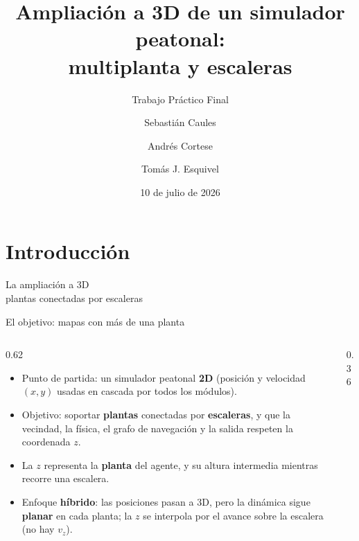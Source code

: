 \documentclass[10pt,aspectratio=169,t]{beamer}
\title[TP Final -- Simulador peatonal 3D]{Ampliación a 3D de un simulador peatonal:\\
  multiplanta y escaleras}
\subtitle{Trabajo Práctico Final}
\author[Caules, Cortese, Esquivel]{Sebastián Caules \and Andrés Cortese \and Tomás J. Esquivel}
\institute[ITBA]{Instituto Tecnológico de Buenos Aires \\ 72.25 -- Simulación de Sistemas -- Grupo 05}
\date{10 de julio de 2026}
\begin{document}
{
  \begin{frame}[plain]
    \titlepage
  \end{frame}
}

\section{Introducción}

\begin{frame}[plain,c]
  \centering
  {\fontsize{40}{48}\selectfont La ampliación a 3D\\[2pt]
   \large plantas conectadas por escaleras\par}
\end{frame}

\begin{frame}[c]{El objetivo: mapas con más de una planta}
  \begin{columns}[T]
    \begin{column}{0.62\textwidth}
      \begin{itemize}
        \item Punto de partida: un simulador peatonal \textbf{2D} (posición y velocidad
          $(x,y)$ usadas en cascada por todos los módulos).
        \item Objetivo: soportar \textbf{plantas} conectadas por \textbf{escaleras}, y que
          la vecindad, la física, el grafo de navegación y la salida respeten la
          coordenada $z$.
        \item La $z$ representa la \textbf{planta} del agente, y su altura intermedia
          mientras recorre una escalera.
        \item Enfoque \textbf{híbrido}: las posiciones pasan a 3D, pero la dinámica sigue
          \textbf{planar} en cada planta; la $z$ se interpola por el avance sobre la
          escalera (no hay $v_z$).
      \end{itemize}
    \end{column}
    \begin{column}{0.36\textwidth}
      \centering
      \resizebox{\linewidth}{!}{}
    \end{column}
  \end{columns}
\end{frame}
\end{document}
